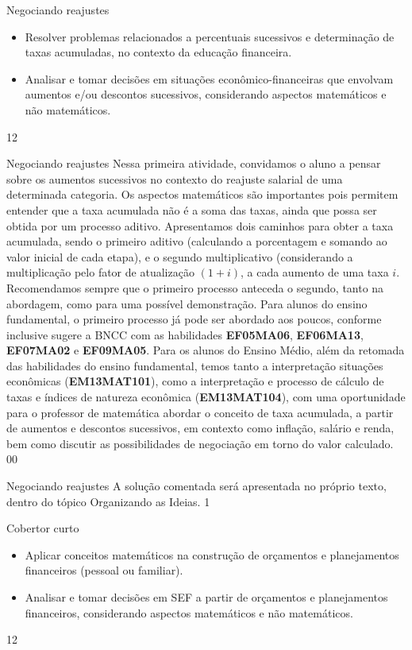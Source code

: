\clearpage
\begin{objectives}{Negociando reajustes}
{
\begin{itemize}
\item Resolver problemas relacionados a percentuais sucessivos e determinação de taxas acumuladas, no contexto da educação financeira.
\item Analisar e tomar decisões em situações econômico-financeiras que envolvam aumentos e/ou descontos sucessivos, considerando aspectos matemáticos e não matemáticos.
\end{itemize}
}{1}{2}
\end{objectives}
\begin{sugestions}{Negociando reajustes}
{
Nessa primeira atividade, convidamos o aluno a pensar sobre os aumentos sucessivos no contexto do reajuste salarial de uma determinada categoria. Os aspectos matemáticos são importantes pois permitem entender que a taxa acumulada não é a soma das taxas, ainda que possa ser obtida por um processo aditivo. Apresentamos dois caminhos para obter a taxa acumulada, sendo o primeiro aditivo (calculando a porcentagem e somando ao valor inicial de cada etapa), e o segundo multiplicativo (considerando a multiplicação pelo fator de atualização $(1+i)$, a cada aumento de uma taxa $i$. Recomendamos sempre que o primeiro processo anteceda o segundo, tanto na abordagem, como para uma possível demonstração. Para alunos do ensino fundamental, o primeiro processo já pode ser abordado aos poucos, conforme inclusive sugere a BNCC com as habilidades \textbf{EF05MA06}, \textbf{EF06MA13}, \textbf{EF07MA02} e \textbf{EF09MA05}. Para os alunos do Ensino Médio, além da retomada das habilidades do ensino fundamental, temos tanto a interpretação situações econômicas (\textbf{EM13MAT101}), como a interpretação e processo de cálculo de taxas e índices de natureza econômica (\textbf{EM13MAT104}), com uma oportunidade para o professor de matemática abordar o conceito de taxa acumulada, a partir de aumentos e descontos sucessivos, em contexto como inflação, salário e renda, bem como discutir as possibilidades de negociação em torno do valor calculado. 
}{0}{0}
\end{sugestions}
\marginpar{\vspace{.5em}}
\begin{answer}{Negociando reajustes}
{
A solução comentada será apresentada no próprio texto, dentro do tópico Organizando as Ideias.
}{1}
\end{answer}
\begin{objectives}{Cobertor curto}
{
\begin{itemize}
\item Aplicar conceitos matemáticos na construção de orçamentos e planejamentos financeiros (pessoal ou familiar).
\item Analisar e tomar decisões em SEF a partir de orçamentos e planejamentos financeiros, considerando aspectos matemáticos e não matemáticos.
\end{itemize}

}{1}{2}
\end{objectives}
